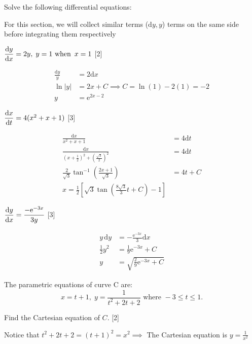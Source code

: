\documentclass[12pt, a4 paper]{article}
\begin{document}
\begin{outline}[enumerate]
 \1 Solve the following differential equations: %
 \begin{answer}
  For this section, we will collect similar terms ($\mathrm{d}y, y$) terms on the same side before integrating them respectively
 \end{answer}

 \2 $\dfrac{{{\rm{d}}y}}{{{\rm{d}}x}} = 2y,\;y = 1{\textrm{ when }}\,x = 1$ \hfill[2]
 \begin{answer}
  \begin{align*}
   \frac{\mathrm{d}y}{y} & = 2\mathrm{d}x                     \\
   \ln|y|                & = 2x+C \implies C=\ln(1)-2(1) = -2 \\
   y                     & = \mathrm{e}^{2x-2}
  \end{align*}
 \end{answer}

 \2 $\dfrac{{{\rm{d}}x}}{{{\rm{d}}t}} = 4({x^2} + x + 1)$ \hfill[3]
 \begin{answer}
  \begin{align*}
   \frac{\mathrm{d}x}{x^2+x+1}                                & = 4\mathrm{d}t \\
   \frac{\mathrm{d}x}{(x+\frac{1}{2})^2+(\frac{\sqrt3}{2})^2} & = 4\mathrm{d}t \\
   \frac{2}{\sqrt3}\tan^{-1}\left(\frac{2x+1}{\sqrt3}\right)  & = 4t + C       \\
   x = \frac{1}{2}\left[\sqrt3\tan\left(\frac{8\sqrt3}{3}t + C\right)-1\right]
  \end{align*}
 \end{answer}

 \2 $\dfrac{{{\rm{d}}y}}{{{\rm{d}}x}} = \dfrac{{ - {\mathrm{e}^{ - 3x}}}}{{3y}}$ \hfill[3]
 \begin{answer}
  \begin{align*}
   y\,\mathrm{d}y & = -\frac{\mathrm{e}^{-3x}}{3} \mathrm{d}x \\
   \frac{1}{2}y^2 & = \frac{1}{9}\mathrm{e}^{-3x} + C         \\
   y              & = \sqrt{\frac{2}{9}\mathrm{e}^{-3x} + C}
  \end{align*}
 \end{answer}

 \1 The parametric equations of curve C are: \[x = t + 1,\;y = \frac{1}{{{t^2} + 2t + 2}}{\textrm{ where }} - 3 \leq t \leq 1.\] %

 \2 Find the Cartesian equation of $C$. \hfill[2]
 \begin{answer}
  Notice that $t^2+2t+2 = (t+1)^2 = x^2\implies$ The Cartesian equation is $y=\frac{1}{x^2}$
 \end{answer}


\end{outline}
\end{document}
